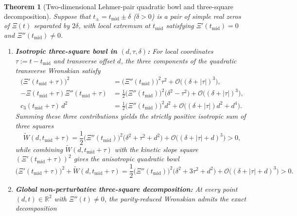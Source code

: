 \documentclass[11pt,reqno,a4paper]{amsart}
\theoremstyle{plain}
\newtheorem{theorem}{Theorem}[section]
\theoremstyle{definition}
\theoremstyle{remark}
\numberwithin{equation}{section}
\begin{document}
\begin{theorem}[Two-dimensional Lehmer-pair quadratic bowl and three-square decomposition]\label{thm:lehmer_bowl}
Suppose that $t_\pm = t_{\mathrm{mid}} \pm \delta$ ($\delta > 0$) is a pair of simple real zeros of $\Xi(t)$ separated by $2\delta$, with local extremum at $t_{\mathrm{mid}}$ satisfying $\Xi'(t_{\mathrm{mid}}) = 0$ and $\Xi''(t_{\mathrm{mid}}) \neq 0$.
\begin{enumerate}[label=\textup{(\arabic*)},leftmargin=2.2em]
  \item \textbf{Isotropic three-square bowl in $(d,\tau,\delta)$:} For local coordinates $\tau := t - t_{\mathrm{mid}}$ and transverse offset $d$, the three components of the quadratic transverse Wronskian satisfy
  \begin{equation}\label{eq:three_components_lehmer}
  \begin{aligned}
    \big(\Xi'(t_{\mathrm{mid}} + \tau)\big)^2 &= \big(\Xi''(t_{\mathrm{mid}})\big)^2\tau^2 + \mathcal{O}\big((\delta + |\tau|)^3\big), \\
    -\Xi(t_{\mathrm{mid}} + \tau)\Xi''(t_{\mathrm{mid}} + \tau) &= \frac{1}{2}\big(\Xi''(t_{\mathrm{mid}})\big)^2\big(\delta^2 - \tau^2\big) + \mathcal{O}\big((\delta + |\tau|)^3\big), \\
    c_3(t_{\mathrm{mid}} + \tau)\,d^2 &= \frac{1}{2}\big(\Xi''(t_{\mathrm{mid}})\big)^2 d^2 + \mathcal{O}\big((\delta + |\tau|)d^2 + d^4\big).
  \end{aligned}
  \end{equation}
  Summing these three contributions yields the strictly positive isotropic sum of three squares
  \begin{equation}\label{eq:lehmer_bowl_isotropic}
    \widetilde{W}(d, t_{\mathrm{mid}} + \tau)
    = \frac{1}{2}\big(\Xi''(t_{\mathrm{mid}})\big)^2\big(\delta^2 + \tau^2 + d^2\big) + \mathcal{O}\big((\delta + |\tau| + d)^3\big) > 0,
  \end{equation}
  while combining $\widetilde{W}(d, t_{\mathrm{mid}}+\tau)$ with the kinetic slope square $(\Xi'(t_{\mathrm{mid}}+\tau))^2$ gives the anisotropic quadratic bowl
  \begin{equation}\label{eq:lehmer_bowl_anisotropic}
    \big(\Xi'(t_{\mathrm{mid}} + \tau)\big)^2 + \widetilde{W}(d, t_{\mathrm{mid}} + \tau)
    = \frac{1}{2}\big(\Xi''(t_{\mathrm{mid}})\big)^2\big(\delta^2 + 3\tau^2 + d^2\big) + \mathcal{O}\big((\delta + |\tau| + d)^3\big) > 0.
  \end{equation}
  \item \textbf{Global non-perturbative three-square decomposition:} At every point $(d,t) \in \mathbb{R}^2$ with $\Xi''(t) \neq 0$, the parity-reduced Wronskian admits the exact decomposition

\end{enumerate}
\end{theorem}
\end{document}
